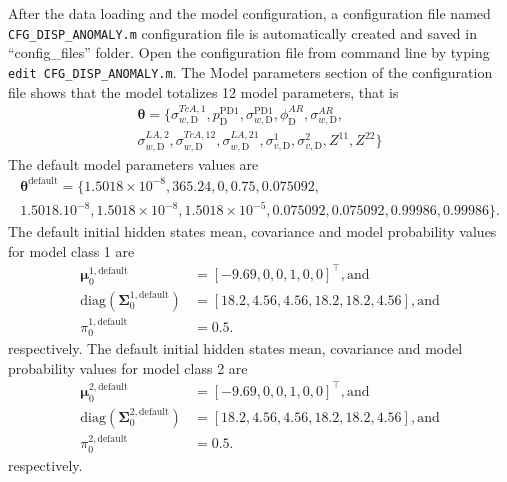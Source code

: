After the data loading and the model configuration, a configuration file named \lstinline[basicstyle = \mlttfamily \small, backgroundcolor = \color{light-gray}]!CFG_DISP_ANOMALY.m! configuration file is automatically created and saved in ``config\_files'' folder.
Open the configuration file from \MATLAB{} command line by typing  \colorbox{light-gray}{\lstinline[basicstyle = \mlttfamily \small, backgroundcolor = \color{light-gray}]!edit CFG_DISP_ANOMALY.m!}.
The Model parameters section of the configuration file shows that the model totalizes 12 model parameters, that is 
\begin{gather*}
\bm\theta=\{\sigma_{w, \text{D}}^{TcA,1}, p^{\text{PD1}}_{\text{D}}, \sigma_{w,\text{D}}^{\text{PD1}}, \phi^{AR}_{\text{D}}, \sigma_{w,\text{D}}^{AR}, \\
 \sigma_{w, \text{D}}^{LA,2}, \sigma_{w, \text{D}}^{TcA, 12}, \sigma_{w, \text{D}}^{LA, 21}, \sigma^{1}_{v,\text{D}}, \sigma^{2}_{v,\text{D}}, Z^{11},   Z^{22}\} 
 \end{gather*}
The default model parameters values are 
\begin{gather*}
\bm\theta^{\text{default}}=\{1.5018\times10^{-8}, 365.24, 0, 0.75, 0.075092, \\
1.5018.10^{-8}, 1.5018\times10^{-8}, 1.5018\times10^{-5}, 0.075092, 0.075092, 0.99986, 0.99986\}.
\end{gather*}
The default initial hidden states mean, covariance  and model probability values for model class 1 are 
\begin{align*}
 \bm \mu^{1,\text{default}}_{0} & = [	-9.69, 	0,     	0,     	1,     	0,     	0        ]^{\intercal}, \text{and} \\
 \text{diag}(\bm\Sigma^{1,\text{default}}_{0})  & = [	18.2,  	4.56 , 	4.56  ,	18.2  ,	18.2  ,	4.56     ], \text{and} \\
 \pi_{0}^{1,\text{default}} & = 0.5.
\end{align*}
respectively.
The default initial hidden states mean, covariance  and model probability values for model class 2 are 
\begin{align*}
 \bm \mu^{2,\text{default}}_{0} & = [	-9.69, 	0,     	0,     	1,     	0,     	0        ]^{\intercal}, \text{and} \\
 \text{diag}(\bm\Sigma^{2,\text{default}}_{0})  & = [	18.2,  	4.56 , 	4.56  ,	18.2  ,	18.2  ,	4.56     ], \text{and} \\
 \pi_{0}^{2,\text{default}} & = 0.5.
\end{align*}
respectively.



